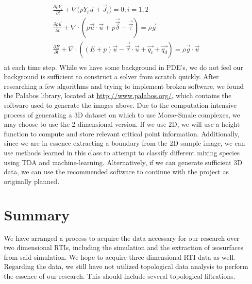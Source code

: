 \documentclass[12pt, fullpage,letterpaper]{article}
\begin{document}
	\begin{gather*}
		\frac{\partial \rho Y_i}{\partial t} + \nabla \dot (\rho Y_i \vec{u} + \vec{J}_i) = 0; i = 1, 2 \\
		\frac{\partial \rho \vec{u}}{\partial t} + \nabla \cdot (\rho \vec{u} \cdot \vec{u} + p \vec{\vec{\delta}} - \vec{\vec{\tau}}) = \rho \vec{g} \\
		\frac{\partial E}{\partial t} + \nabla \cdot ((E + p)\vec{u} -\vec{\vec{\tau}}\cdot \vec{u} + \vec{q_c} + \vec{q_d} ) = \rho \vec{g} \cdot \vec{u} \\
	\end{gather*} 
	at each time step. While we have some background in PDE's, we do not feel our background is sufficient to construct a solver from scratch quickly. After researching a few algorithms and trying to implement broken software, we found the Palabos library, located at \url{http://www.palabos.org/}, which contains the software used to generate the images above. Due to the computation intensive process of generating a 3D dataset on which to use Morse-Smale complexes, we may choose to use the 2-dimensional version. If we use 2D, we will use a height function to compute and store relevant critical point information. Additionally, since we are in essence extracting a boundary from the 2D sample image, we can use methods learned in this class to attempt to classify different mixing species using TDA and machine-learning. Alternatively, if we can generate sufficient 3D data, we can use the recommended software to continue with the project as originally planned.
	
	 	\section*{\normalfont Summary}
	We have arranged a process to acquire the data necessary for our research over two dimensional RTIs, including the simulation and the extraction of isosurfaces from said simulation. We hope to acquire three dimensional RTI data as well. Regarding the data, we still have not utilized topological data analysis to perform the essence of our research. This should include several topological filtrations.
	
\end{document}
